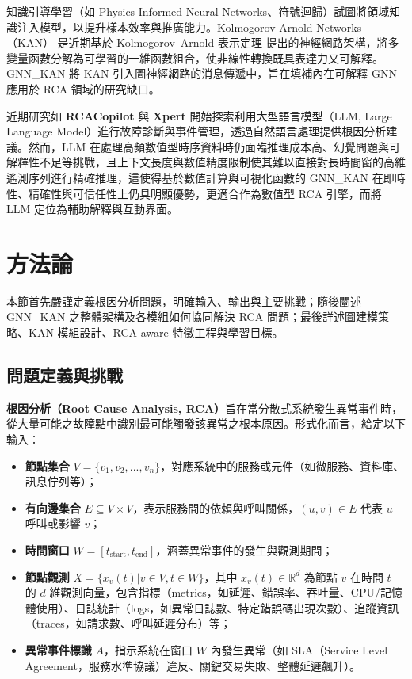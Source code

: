\documentclass[10pt,a4paper,twocolumn]{article}
\begin{document}
知識引導學習（如 Physics-Informed Neural Networks、符號迴歸）試圖將領域知識注入模型，以提升樣本效率與推廣能力。Kolmogorov-Arnold Networks（KAN）\cite{kan2024} 是近期基於 Kolmogorov–Arnold 表示定理 \cite{kolmogorov1957} 提出的神經網路架構，將多變量函數分解為可學習的一維函數組合，使非線性轉換既具表達力又可解釋。GNN\_KAN 將 KAN 引入圖神經網路的消息傳遞中，旨在填補內在可解釋 GNN 應用於 RCA 領域的研究缺口。

近期研究如 \textbf{RCACopilot} \cite{rcacopilot2024} 與 \textbf{Xpert} \cite{xpert2024} 開始探索利用大型語言模型（LLM, Large Language Model）進行故障診斷與事件管理，透過自然語言處理提供根因分析建議。然而，LLM 在處理高頻數值型時序資料時仍面臨推理成本高、幻覺問題與可解釋性不足等挑戰，且上下文長度與數值精度限制使其難以直接對長時間窗的高維遙測序列進行精確推理，這使得基於數值計算與可視化函數的 GNN\_KAN 在即時性、精確性與可信任性上仍具明顯優勢，更適合作為數值型 RCA 引擎，而將 LLM 定位為輔助解釋與互動界面。

\section{方法論}

本節首先嚴謹定義根因分析問題，明確輸入、輸出與主要挑戰；隨後闡述 GNN\_KAN 之整體架構及各模組如何協同解決 RCA 問題；最後詳述圖建模策略、KAN 模組設計、RCA-aware 特徵工程與學習目標。

\subsection{問題定義與挑戰}

\textbf{根因分析（Root Cause Analysis, RCA）}旨在當分散式系統發生異常事件時，從大量可能之故障點中識別最可能觸發該異常之根本原因。形式化而言，給定以下輸入：

\begin{itemize}
\item \textbf{節點集合} $V = \{v_1, v_2, ..., v_n\}$，對應系統中的服務或元件（如微服務、資料庫、訊息佇列等）；
\item \textbf{有向邊集合} $E \subseteq V \times V$，表示服務間的依賴與呼叫關係，$(u, v) \in E$ 代表 $u$ 呼叫或影響 $v$；
\item \textbf{時間窗口} $W = [t_{\text{start}}, t_{\text{end}}]$，涵蓋異常事件的發生與觀測期間；
\item \textbf{節點觀測} $X = \{x_v(t) | v \in V, t \in W\}$，其中 $x_v(t) \in \mathbb{R}^d$ 為節點 $v$ 在時間 $t$ 的 $d$ 維觀測向量，包含指標（metrics，如延遲、錯誤率、吞吐量、CPU/記憶體使用）、日誌統計（logs，如異常日誌數、特定錯誤碼出現次數）、追蹤資訊（traces，如請求數、呼叫延遲分布）等；
\item \textbf{異常事件標識} $A$，指示系統在窗口 $W$ 內發生異常（如 SLA（Service Level Agreement，服務水準協議）違反、關鍵交易失敗、整體延遲飆升）。
\end{itemize}
\end{document}
